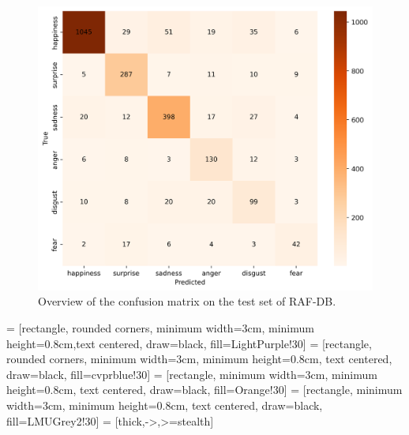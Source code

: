 \begin{figure}[ht]
  \centering
   \includegraphics[width=\linewidth]{mattest.png}
   \caption{Overview of the confusion matrix on the test set of RAF-DB.} 
   \label{fig:mattest}
\end{figure}

 = [rectangle, rounded corners, minimum width=3cm, minimum height=0.8cm,text centered, draw=black, fill=LightPurple!30]
 = [rectangle, rounded corners, minimum width=3cm, minimum height=0.8cm, text centered, draw=black, fill=cvprblue!30]
 = [rectangle, minimum width=3cm, minimum height=0.8cm, text centered, draw=black, fill=Orange!30]
 = [rectangle, minimum width=3cm, minimum height=0.8cm, text centered, draw=black, fill=LMUGrey2!30]
 = [thick,->,>=stealth]

